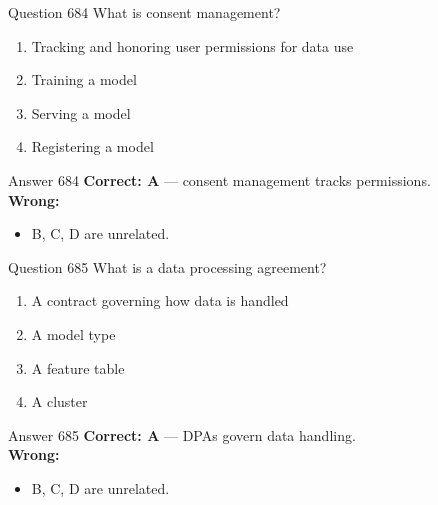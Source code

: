 \documentclass[aspectratio=169,11pt]{beamer}
\begin{document}
	\begin{frame}{Question 684}
		What is consent management?
		\begin{enumerate}[label=\Alph*.]
			\item Tracking and honoring user permissions for data use
			\item Training a model
			\item Serving a model
			\item Registering a model
		\end{enumerate}
	\end{frame}
	\begin{frame}{Answer 684}
		\textbf{Correct: A} --- consent management tracks permissions.\\
		\vspace{0.5em}
		\textbf{Wrong:}
		\begin{itemize}
			\item B, C, D are unrelated.
		\end{itemize}
	\end{frame}
	
	\begin{frame}{Question 685}
		What is a data processing agreement?
		\begin{enumerate}[label=\Alph*.]
			\item A contract governing how data is handled
			\item A model type
			\item A feature table
			\item A cluster
		\end{enumerate}
	\end{frame}
	\begin{frame}{Answer 685}
		\textbf{Correct: A} --- DPAs govern data handling.\\
		\vspace{0.5em}
		\textbf{Wrong:}
		\begin{itemize}
			\item B, C, D are unrelated.
		\end{itemize}
	\end{frame}
	
\end{document}
